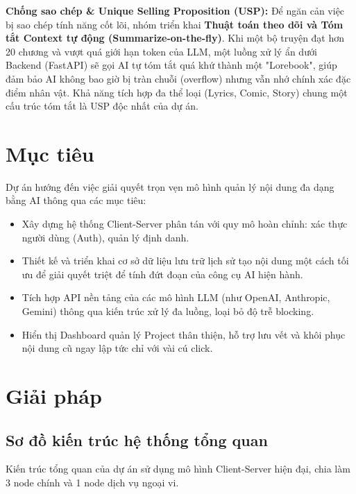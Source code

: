 \documentclass[final]{hcmuitthesis}
\begin{document}
\textbf{Chống sao chép \& Unique Selling Proposition (USP):}
Để ngăn cản việc bị sao chép tính năng cốt lõi, nhóm triển khai \textbf{Thuật toán theo dõi và Tóm tắt Context tự động (Summarize-on-the-fly)}. Khi một bộ truyện đạt hơn 20 chương và vượt quá giới hạn token của LLM, một luồng xử lý ẩn dưới Backend (FastAPI) sẽ gọi AI tự tóm tắt quá khứ thành một "Lorebook", giúp đảm bảo AI không bao giờ bị tràn chuỗi (overflow) nhưng vẫn nhớ chính xác đặc điểm nhân vật. Khả năng tích hợp đa thể loại (Lyrics, Comic, Story) chung một cấu trúc tóm tắt là USP độc nhất của dự án.

\chapter{Mục tiêu}
Dự án hướng đến việc giải quyết trọn vẹn mô hình quản lý nội dung đa dạng bằng AI thông qua các mục tiêu:
\begin{itemize}
    \item Xây dựng hệ thống Client-Server phân tán với quy mô hoàn chỉnh: xác thực người dùng (Auth), quản lý định danh.
    \item Thiết kế và triển khai cơ sở dữ liệu lưu trữ lịch sử tạo nội dung một cách tối ưu để giải quyết triệt để tính đứt đoạn của công cụ AI hiện hành.
    \item Tích hợp API nền tảng của các mô hình LLM (như OpenAI, Anthropic, Gemini) thông qua kiến trúc xử lý đa luồng, loại bỏ độ trễ blocking.
    \item Hiển thị Dashboard quản lý Project thân thiện, hỗ trợ lưu vết và khôi phục nội dung cũ ngay lập tức chỉ với vài cú click.
\end{itemize}

\chapter{Giải pháp}
\section{Sơ đồ kiến trúc hệ thống tổng quan}
Kiến trúc tổng quan của dự án sử dụng mô hình Client-Server hiện đại, chia làm 3 node chính và 1 node dịch vụ ngoại vi.
\end{document}
